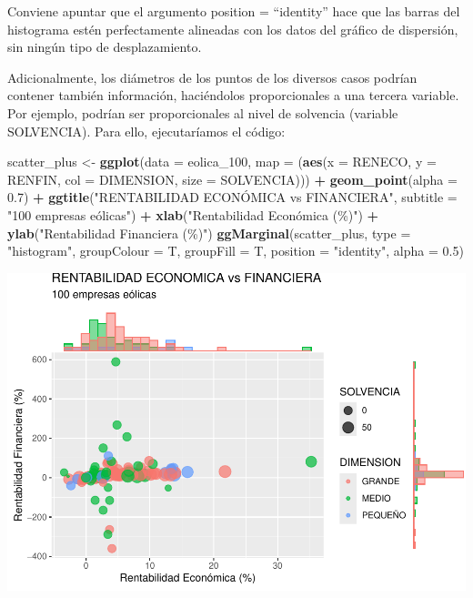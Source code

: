 \documentclass[
]{book}
\newenvironment{Shaded}{\begin{snugshade}}{\end{snugshade}}
\newcommand{\AttributeTok}[1]{\textcolor[rgb]{0.13,0.29,0.53}{#1}}
\newcommand{\FloatTok}[1]{\textcolor[rgb]{0.00,0.00,0.81}{#1}}
\newcommand{\FunctionTok}[1]{\textcolor[rgb]{0.13,0.29,0.53}{\textbf{#1}}}
\newcommand{\NormalTok}[1]{#1}
\newcommand{\OtherTok}[1]{\textcolor[rgb]{0.56,0.35,0.01}{#1}}
\newcommand{\SpecialCharTok}[1]{\textcolor[rgb]{0.81,0.36,0.00}{\textbf{#1}}}
\newcommand{\StringTok}[1]{\textcolor[rgb]{0.31,0.60,0.02}{#1}}
\let\Oldincludegraphics\includegraphics
\renewcommand{\includegraphics}[2][]{%
  \Oldincludegraphics[#1]{#2}%
}
\begin{document}
Conviene apuntar que el argumento position = ``identity'' hace que las barras del histograma estén perfectamente alineadas con los datos del gráfico de dispersión, sin ningún tipo de desplazamiento.

Adicionalmente, los diámetros de los puntos de los diversos casos podrían contener también información, haciéndolos proporcionales a una tercera variable. Por ejemplo, podrían ser proporcionales al nivel de solvencia (variable SOLVENCIA). Para ello, ejecutaríamos el código:

\begin{Shaded}
\begin{Highlighting}[]
\NormalTok{scatter\_plus }\OtherTok{\textless{}{-}} \FunctionTok{ggplot}\NormalTok{(}\AttributeTok{data =}\NormalTok{ eolica\_100, }\AttributeTok{map =}\NormalTok{ (}\FunctionTok{aes}\NormalTok{(}\AttributeTok{x =}\NormalTok{ RENECO,}
                                                     \AttributeTok{y =}\NormalTok{ RENFIN,}
                                                     \AttributeTok{col =}\NormalTok{ DIMENSION,}
                                                     \AttributeTok{size =}\NormalTok{ SOLVENCIA))) }\SpecialCharTok{+}
  \FunctionTok{geom\_point}\NormalTok{(}\AttributeTok{alpha =} \FloatTok{0.7}\NormalTok{) }\SpecialCharTok{+}
  \FunctionTok{ggtitle}\NormalTok{(}\StringTok{"RENTABILIDAD ECONÓMICA vs FINANCIERA"}\NormalTok{,}
          \AttributeTok{subtitle =} \StringTok{"100 empresas eólicas"}\NormalTok{) }\SpecialCharTok{+}
  \FunctionTok{xlab}\NormalTok{(}\StringTok{"Rentabilidad Económica (\%)"}\NormalTok{) }\SpecialCharTok{+}
  \FunctionTok{ylab}\NormalTok{(}\StringTok{"Rentabilidad Financiera (\%)"}\NormalTok{)}
\FunctionTok{ggMarginal}\NormalTok{(scatter\_plus, }\AttributeTok{type =} \StringTok{"histogram"}\NormalTok{, }\AttributeTok{groupColour =}\NormalTok{ T,}
           \AttributeTok{groupFill =}\NormalTok{ T, }\AttributeTok{position =} \StringTok{"identity"}\NormalTok{, }\AttributeTok{alpha =} \FloatTok{0.5}\NormalTok{)}
\end{Highlighting}
\end{Shaded}

\includegraphics{_main_files/figure-latex/unnamed-chunk-122-1.pdf}
\end{document}
